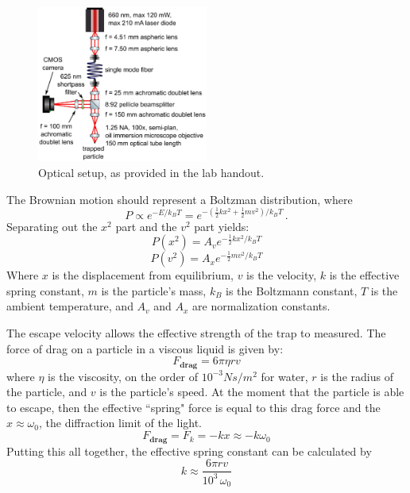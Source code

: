 \documentclass[12pt]{article}
\begin{document}
\begin{figure}
\centering
    \includegraphics[width=0.5\textwidth]{optical_trap.jpg}
	\caption{Optical setup, as provided in the lab handout.}
    \label{fig:opt_trap}
\end{figure} %

The Brownian motion should represent a Boltzman distribution, where 
\begin{equation*}
P \propto e^{-E/k_B T} = e^{-(\frac{1}{2}kx^2 + \frac{1}{2}mv^2)/k_B T} \, .
\end{equation*}
Separating out the $x^2$ part and the $v^2$ part yields:
\begin{equation}
P(x^2) = A_v e^{-\frac{1}{2}kx^2 /k_B T}
\label{bolt_eq1}
\end{equation}
\begin{equation}
P(v^2) = A_x e^{-\frac{1}{2}mv^2 /k_B T}
\label{bolt_eq2}
\end{equation}
Where $x$ is the displacement from equilibrium, $v$ is the velocity, $k$ is the effective spring constant, $m$ is the particle's mass, $k_B$ is the Boltzmann constant, $T$ is the ambient temperature, and $A_v$ and $A_x$ are normalization constants.

The escape velocity allows the effective strength of the trap to measured. The force of drag on a particle in a viscous liquid is given by:
\begin{equation*}
F_\textbf{drag} = 6\pi \eta r v
\end{equation*}
where $\eta$ is the viscosity, on the order of $10^{-3} Ns/m^2$ for water, $r$ is the radius of the particle, and $v$ is the particle's speed. At the moment that the particle is able to escape, then the effective ``spring" force is equal to this drag force and the $x \approx \omega_0$, the diffraction limit of the light.
\begin{equation*}
F_\textbf{drag} = F_k = -kx \approx -k \omega_0
\end{equation*}
Putting this all together, the effective spring constant can be calculated by
\begin{equation}
k \approx \frac{6\pi r v}{10^3 \, \omega_0}
\label{eff_spring}
\end{equation}
\end{document}

